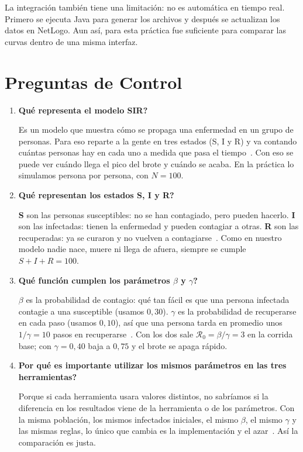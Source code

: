 \documentclass[11pt,a4paper]{article}
\begin{document}
La integración también tiene una limitación: no es automática en tiempo real. Primero se ejecuta Java para generar los archivos y después se actualizan los datos en NetLogo. Aun así, para esta práctica fue suficiente para comparar las curvas dentro de una misma interfaz.

\setlength{\parskip}{0.22em}

\FloatBarrier
\section{Preguntas de Control}
\begin{enumerate}
  \item \textbf{\textquestiondown{}Qué representa el modelo SIR?}
  \par Es un modelo que muestra cómo se propaga una enfermedad en un grupo de personas. Para eso reparte a la gente en tres estados (S, I y R) y va contando cuántas personas hay en cada uno a medida que pasa el tiempo~\cite{guia}. Con eso se puede ver cuándo llega el pico del brote y cuándo se acaba. En la práctica lo simulamos persona por persona, con $N=100$.
  \item \textbf{\textquestiondown{}Qué representan los estados S, I y R?}
  \par \textbf{S} son las personas susceptibles: no se han contagiado, pero pueden hacerlo. \textbf{I} son las infectadas: tienen la enfermedad y pueden contagiar a otras. \textbf{R} son las recuperadas: ya se curaron y no vuelven a contagiarse~\cite{guia}. Como en nuestro modelo nadie nace, muere ni llega de afuera, siempre se cumple $S+I+R=100$.
  \item \textbf{\textquestiondown{}Qué función cumplen los parámetros $\beta$ y $\gamma$?}
  \par $\beta$ es la probabilidad de contagio: qué tan fácil es que una persona infectada contagie a una susceptible (usamos $0{,}30$). $\gamma$ es la probabilidad de recuperarse en cada paso (usamos $0{,}10$), así que una persona tarda en promedio unos $1/\gamma = 10$ pasos en recuperarse~\cite{guia}. Con los dos sale $\mathcal{R}_0=\beta/\gamma=3$ en la corrida base; con $\gamma=0{,}40$ baja a $0{,}75$ y el brote se apaga rápido.
  \item \textbf{\textquestiondown{}Por qué es importante utilizar los mismos parámetros en las tres herramientas?}
  \par Porque si cada herramienta usara valores distintos, no sabríamos si la diferencia en los resultados viene de la herramienta o de los parámetros. Con la misma población, los mismos infectados iniciales, el mismo $\beta$, el mismo $\gamma$ y las mismas reglas, lo único que cambia es la implementación y el azar~\cite{guia}. Así la comparación es justa.

\end{enumerate}
\end{document}
